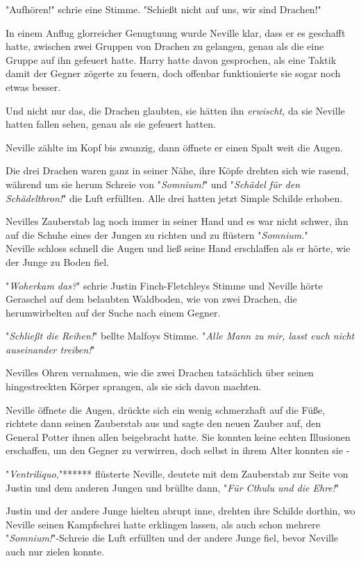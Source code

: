 {"Aufhören!" schrie eine Stimme. "Schießt nicht auf uns, wir sind Drachen!"

In einem Anflug glorreicher Genugtuung wurde Neville klar, dass er es geschafft hatte, zwischen zwei Gruppen von Drachen zu gelangen, genau als die eine Gruppe auf ihn gefeuert hatte. Harry hatte davon gesprochen, als eine Taktik damit der Gegner zögerte zu feuern, doch offenbar funktionierte sie sogar noch etwas besser.

Und nicht nur das, die Drachen glaubten, sie hätten ihn \emph{erwischt,} da sie Neville hatten fallen sehen, genau als sie gefeuert hatten.

Neville zählte im Kopf bis zwanzig, dann öffnete er einen Spalt weit die Augen.

Die drei Drachen waren ganz in seiner Nähe, ihre Köpfe drehten sich wie rasend, während um sie herum Schreie von "\emph{Somnium!}" und "\emph{Schädel für den Schädelthron!}" die Luft erfüllten. Alle drei hatten jetzt Simple Schilde erhoben.

Nevilles Zauberstab lag noch immer in seiner Hand und es war nicht schwer, ihn auf die Schuhe eines der Jungen zu richten und zu flüstern "\emph{Somnium.}"\\ Neville schloss schnell die Augen und ließ seine Hand erschlaffen als er hörte, wie der Junge zu Boden fiel.

"\emph{Woherkam das?}" schrie Justin Finch-Fletchleys Stimme und Neville hörte Geraschel auf dem belaubten Waldboden, wie von zwei Drachen, die herumwirbelten auf der Suche nach einem Gegner.

"\emph{Schließt die Reihen!}" bellte Malfoys Stimme. "\emph{Alle Mann zu mir, lasst euch nicht auseinander treiben!}"

Nevilles Ohren vernahmen, wie die zwei Drachen tatsächlich über seinen hingestreckten Körper sprangen, als sie sich davon machten.

Neville öffnete die Augen, drückte sich ein wenig schmerzhaft auf die Füße, richtete dann seinen Zauberstab aus und sagte den neuen Zauber auf, den General Potter ihnen allen beigebracht hatte. Sie konnten keine echten Illusionen erschaffen, um den Gegner zu verwirren, doch selbst in ihrem Alter konnten sie -

"\emph{Ventriliquo,}"****** flüsterte Neville, deutete mit dem Zauberstab zur Seite von Justin und dem anderen Jungen und brüllte dann, "\emph{Für Cthulu und die Ehre!}"

Justin und der andere Junge hielten abrupt inne, drehten ihre Schilde dorthin, wo Neville seinen Kampfschrei hatte erklingen lassen, als auch schon mehrere "\emph{Somnium!}"-Schreie die Luft erfüllten und der andere Junge fiel, bevor Neville auch nur zielen konnte.

}
